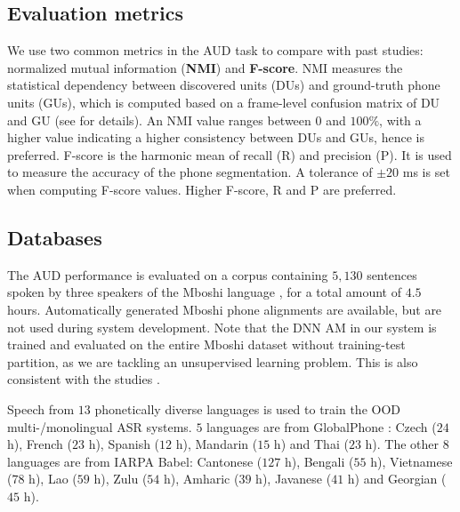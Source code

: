 \documentclass[a4paper]{article}
\begin{document}
\subsection{Evaluation metrics}
\label{subsec:setup_eval}
We use two common metrics in the AUD task \cite{ondel2016variational,Ebbers2017,Yusuf2020hierarchical} to compare with past studies: 
normalized mutual information (\textbf{NMI})  and \textbf{F-score}. NMI   measures the statistical dependency between discovered units (DUs) and ground-truth phone units (GUs), which is computed based on a frame-level confusion matrix of DU and GU  (see \cite{Yusuf2020hierarchical} for details). An NMI value ranges between $0$  and $100\%$, with a higher value  indicating a higher consistency between DUs and GUs, hence is preferred. F-score is  the harmonic mean of recall (R) and precision (P). It is used to measure  the accuracy of the phone segmentation. 
A tolerance of $\pm20$ ms is set when computing F-score values. 
Higher F-score, R and P   are preferred. %

\subsection{Databases}


\label{subsec:setup_database}
The AUD  performance    is evaluated on a corpus
 containing $5,130$ sentences spoken by three speakers of the Mboshi language  \cite{Godard2018mboshi}, 
for a total amount of $4.5$ hours. Automatically generated Mboshi phone alignments are available, but are not used during   system development. Note that the DNN AM in our system is trained and evaluated on the entire Mboshi dataset without training-test partition, as we are tackling an unsupervised learning problem. This  is also consistent with  the  studies   \cite{Yusuf2020hierarchical,Ondel2019Bayesian}.

Speech from $13$ phonetically diverse languages \cite{zelasko2020sounds} is used to train the OOD multi-/monolingual ASR systems. $5$ languages are from GlobalPhone  \cite{schultz2002globalphone}: Czech ($24$ h), French ($23$ h), Spanish ($12$ h), Mandarin ($15$ h) and Thai ($23$ h). The other $8$ languages are from IARPA Babel: Cantonese ($127$ h), Bengali ($55$ h), Vietnamese ($78$ h), Lao ($59$ h), Zulu ($54$ h), Amharic ($39$ h), Javanese ($41$ h) and Georgian ($45$ h).
\end{document}
